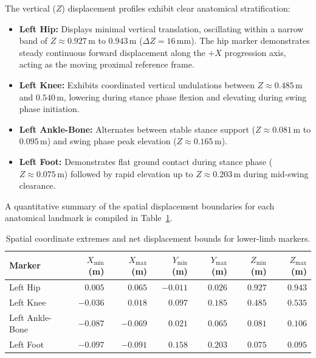 \documentclass[12pt,a4paper]{article}
\begin{document}
The vertical ($Z$) displacement profiles exhibit clear anatomical stratification:
\begin{itemize}
    \item \textbf{Left Hip:} Displays minimal vertical translation, oscillating within a narrow band of $Z \approx 0.927\,\mathrm{m}$ to $0.943\,\mathrm{m}$ ($\Delta Z = 16\,\mathrm{mm}$). The hip marker demonstrates steady continuous forward displacement along the $+X$ progression axis, acting as the moving proximal reference frame.
    \item \textbf{Left Knee:} Exhibits coordinated vertical undulations between $Z \approx 0.485\,\mathrm{m}$ and $0.540\,\mathrm{m}$, lowering during stance phase flexion and elevating during swing phase initiation.
    \item \textbf{Left Ankle-Bone:} Alternates between stable stance support ($Z \approx 0.081\,\mathrm{m}$ to $0.095\,\mathrm{m}$) and swing phase peak elevation ($Z \approx 0.165\,\mathrm{m}$).
    \item \textbf{Left Foot:} Demonstrates flat ground contact during stance phase ($Z \approx 0.075\,\mathrm{m}$) followed by rapid elevation up to $Z \approx 0.203\,\mathrm{m}$ during mid-swing clearance.
\end{itemize}

A quantitative summary of the spatial displacement boundaries for each anatomical landmark is compiled in Table~\ref{tab:marker-displacements}.

\begin{table}[H]\centering
\caption{Spatial coordinate extremes and net displacement bounds for lower-limb markers.}
\begin{tabularx}{\textwidth}{lrrrrrr}
\toprule
\textbf{Marker} & \textbf{$X_{\min}$ (m)} & \textbf{$X_{\max}$ (m)} & \textbf{$Y_{\min}$ (m)} & \textbf{$Y_{\max}$ (m)} & \textbf{$Z_{\min}$ (m)} & \textbf{$Z_{\max}$ (m)} \\
\midrule
Left Hip & $0.005$ & $0.065$ & $-0.011$ & $0.026$ & $0.927$ & $0.943$ \\
Left Knee & $-0.036$ & $0.018$ & $0.097$ & $0.185$ & $0.485$ & $0.535$ \\
Left Ankle-Bone & $-0.087$ & $-0.069$ & $0.021$ & $0.065$ & $0.081$ & $0.106$ \\
Left Foot & $-0.097$ & $-0.091$ & $0.158$ & $0.203$ & $0.075$ & $0.095$ \\
\bottomrule
\end{tabularx}
\label{tab:marker-displacements}
\end{table}
\end{document}
